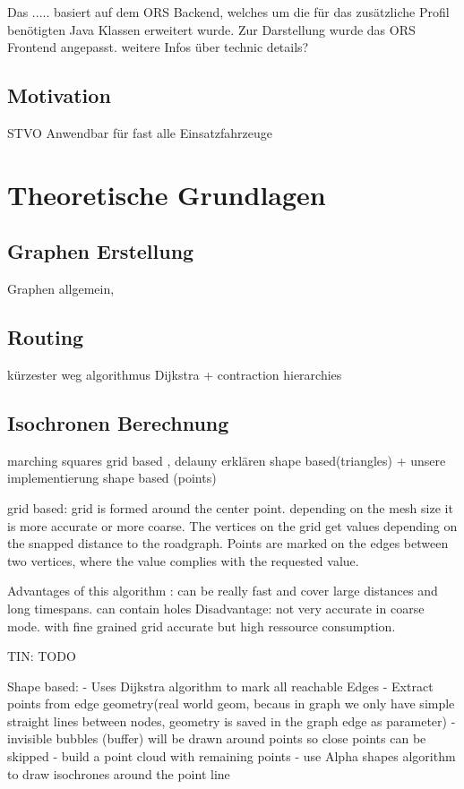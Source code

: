 \documentclass[10pt,a4paper]{article}
\begin{document}
Das ..... basiert auf dem ORS Backend, welches um die für das zusätzliche Profil benötigten Java Klassen erweitert wurde. Zur Darstellung wurde das ORS Frontend angepasst. 
weitere Infos über technic details? 

\subsection{Motivation}

STVO
Anwendbar für fast alle Einsatzfahrzeuge 

\section{Theoretische Grundlagen}

\subsection{Graphen Erstellung}

Graphen allgemein,

\subsection{Routing}

kürzester weg 
algorithmus Dijkstra + contraction hierarchies

\subsection{Isochronen Berechnung}

marching squares grid based , delauny erklären shape based(triangles) + unsere implementierung shape based (points)

grid based:
 grid is formed around the center point. depending on the mesh size it is more accurate or more coarse.
 The vertices on the grid get values depending on the snapped distance to the roadgraph.
 Points are marked on the edges between two vertices, where the value complies with the requested value.
 
Advantages of this algorithm : can be really fast and cover large distances and long timespans. can contain holes
Disadvantage: not very accurate in coarse mode. with fine grained grid accurate but high ressource consumption.

TIN:
TODO

Shape based:
- Uses Dijkstra algorithm to mark all reachable Edges
- Extract points from edge geometry(real world geom, becaus in graph we only have simple straight lines between nodes, geometry is saved in the graph edge as parameter)
- invisible bubbles (buffer) will be drawn around points so close points can be skipped
- build a point cloud with remaining points
- use Alpha shapes algorithm to draw isochrones around the point line
\end{document}
